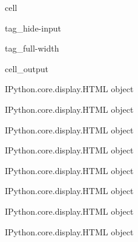 \documentclass[letterpaper,10pt,english]{jupyterBook}
\begin{document}
\begin{sphinxuseclass}{cell}
\begin{sphinxuseclass}{tag_hide-input}
\begin{sphinxuseclass}{tag_full-width}\begin{sphinxVerbatimOutput}

\begin{sphinxuseclass}{cell_output}
\begin{sphinxVerbatim}[commandchars=\\\{\}]
\PYGZlt{}IPython.core.display.HTML object\PYGZgt{}
\end{sphinxVerbatim}

\begin{sphinxVerbatim}[commandchars=\\\{\}]
\PYGZlt{}IPython.core.display.HTML object\PYGZgt{}
\end{sphinxVerbatim}

\begin{sphinxVerbatim}[commandchars=\\\{\}]
\PYGZlt{}IPython.core.display.HTML object\PYGZgt{}
\end{sphinxVerbatim}

\begin{sphinxVerbatim}[commandchars=\\\{\}]
\PYGZlt{}IPython.core.display.HTML object\PYGZgt{}
\end{sphinxVerbatim}

\begin{sphinxVerbatim}[commandchars=\\\{\}]
\PYGZlt{}IPython.core.display.HTML object\PYGZgt{}
\end{sphinxVerbatim}

\begin{sphinxVerbatim}[commandchars=\\\{\}]
\PYGZlt{}IPython.core.display.HTML object\PYGZgt{}
\end{sphinxVerbatim}

\begin{sphinxVerbatim}[commandchars=\\\{\}]
\PYGZlt{}IPython.core.display.HTML object\PYGZgt{}
\end{sphinxVerbatim}

\begin{sphinxVerbatim}[commandchars=\\\{\}]
\PYGZlt{}IPython.core.display.HTML object\PYGZgt{}
\end{sphinxVerbatim}


\end{sphinxuseclass}
\end{sphinxVerbatimOutput}
\end{sphinxuseclass}
\end{sphinxuseclass}
\end{sphinxuseclass}
\end{document}
